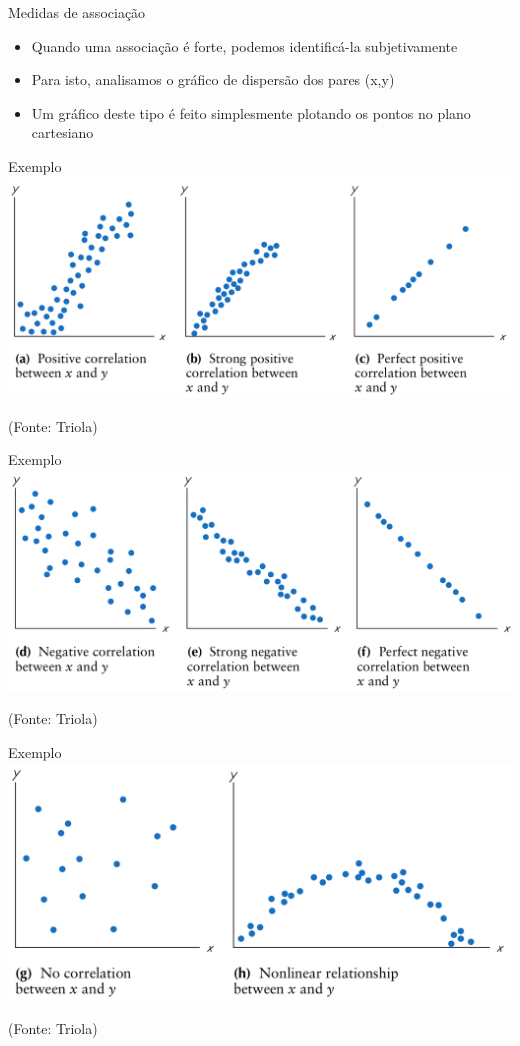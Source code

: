 \documentclass{beamer}
\begin{document}
\begin{frame}{Medidas de associação}
  \begin{itemize}
  \item Quando uma associação é forte, podemos identificá-la
    subjetivamente
  \item Para isto, analisamos o gráfico de dispersão dos pares (x,y)
  \item Um gráfico deste tipo é feito simplesmente plotando os pontos
    no plano cartesiano
  \end{itemize}
\end{frame}

\begin{frame}{Exemplo}
  \includegraphics[height=0.6\textheight]{Assoc/positive}

  (Fonte: Triola)
\end{frame}

\begin{frame}{Exemplo}
  \includegraphics[height=0.6\textheight]{Assoc/negative}

  (Fonte: Triola)
\end{frame}

\begin{frame}{Exemplo}
  \includegraphics[height=0.6\textheight]{Assoc/other}

  (Fonte: Triola)
\end{frame}
\end{document}
